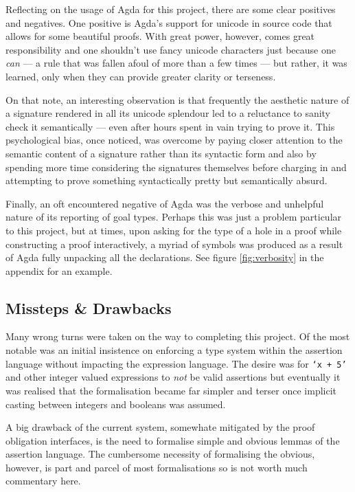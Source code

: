 \documentclass[oneside,12pt]{article}
\begin{document}
Reflecting on the usage of Agda for this project, there are some clear positives and negatives. One positive is Agda's support for unicode in source code that allows for some beautiful proofs. With great power, however, comes great responsibility and one shouldn't use fancy unicode characters just because one \emph{can} --- a rule that was fallen afoul of more than a few times --- but rather, it was learned, only when they can provide greater clarity or terseness.

On that note, an interesting observation is that frequently the aesthetic nature of a signature rendered in all its unicode splendour led to a reluctance to sanity check it semantically --- even after hours spent in vain trying to prove it. This psychological bias, once noticed, was overcome by paying closer attention to the semantic content of a signature rather than its syntactic form and also by spending more time considering the signatures themselves before charging in and attempting to prove something syntactically pretty but semantically absurd.

Finally, an oft encountered negative of Agda was the verbose and unhelpful nature of its reporting of goal types. Perhaps this was just a problem particular to this project, but at times, upon asking for the type of a hole in a proof while constructing a proof interactively, a myriad of symbols was produced as a result of Agda fully unpacking all the declarations. See figure \ref{fig:verbosity} in the appendix for an example.

\subsection{Missteps \& Drawbacks}

Many wrong turns were taken on the way to completing this project. Of the most notable was an initial insistence on enforcing a type system within the assertion language without impacting the expression language. The desire was for \texttt{`x + 5'} and other integer valued expressions to \emph{not} be valid assertions but eventually it was realised that the formalisation became far simpler and terser once implicit casting between integers and booleans was assumed.

A big drawback of the current system, somewhate mitigated by the proof obligation interfaces, is the need to formalise simple and obvious lemmas of the assertion language. The cumbersome necessity of formalising the obvious, however, is part and parcel of most formalisations so is not worth much commentary here.
\end{document}
